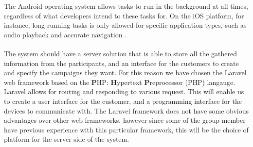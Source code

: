 The Android operating system allows tasks to run in the background at all times, regardless of what developers intend to these tasks for. On the iOS platform, for instance, long-running tasks is only allowed for specific application types, such as audio playback and accurate navigation \parencite{apple_long_running_task}.
\\\\
The system should have a server solution that is able to store all the gathered information from the participants, and an interface for the customers to create and specify the campaigns they want. For this reason we have chosen the Laravel web framework based on the \textbf{P}HP: \textbf{H}ypertext \textbf{P}reprocessor (PHP) langauge. Laravel allows for routing and responding to various request. This will enable us to create a user interface for the customer, and a programming interface for the devices to communicate with. The Laravel framework does not have some obvious advantages over other web frameworks, however since some of the group member have previous experience with this particular framework, this will be the choice of platform for the server side of the system.


